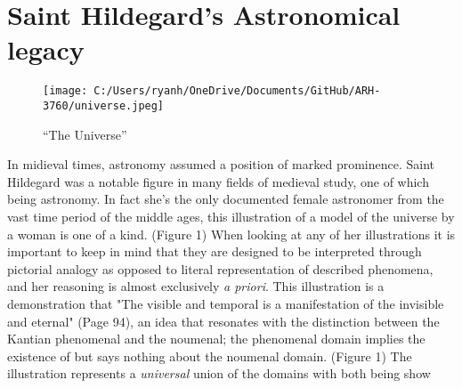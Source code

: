 \documentclass{turabian-researchpaper}
\begin{document}

\section{Saint Hildegard's Astronomical legacy}
\begin{wrapfigure}{r}{0.4\textwidth}
    \centering
    \texttt{[image: C:/Users/ryanh/OneDrive/Documents/GitHub/ARH-3760/universe.jpeg]}
    \caption{``The Universe''}\label{Figure A}
\end{wrapfigure}

In midieval times, astronomy assumed a position of marked prominence. Saint Hildegard was a notable figure in many fields of 
medieval study, one of which being astronomy. In fact she's the only documented female astronomer
from the vast time period of the middle ages, this illustration of a model of the universe by a woman is one of a kind. (Figure 1)
When looking at any of her illustrations it is important to keep in mind that
they are designed to be interpreted through pictorial analogy as opposed to literal representation of described phenomena,
and her reasoning is almost exclusively \emph{a priori}.
This illustration is a demonstration that "The visible and temporal is a manifestation of the invisible and eternal" (Page 94),
an idea that resonates with the distinction between the Kantian phenomenal and the noumenal; the phenomenal domain implies
the existence of but 
says nothing about the noumenal domain. (Figure 1) The illustration represents a \emph{universal} union of the domains
with both being show


\printbibliography
\end{document}

